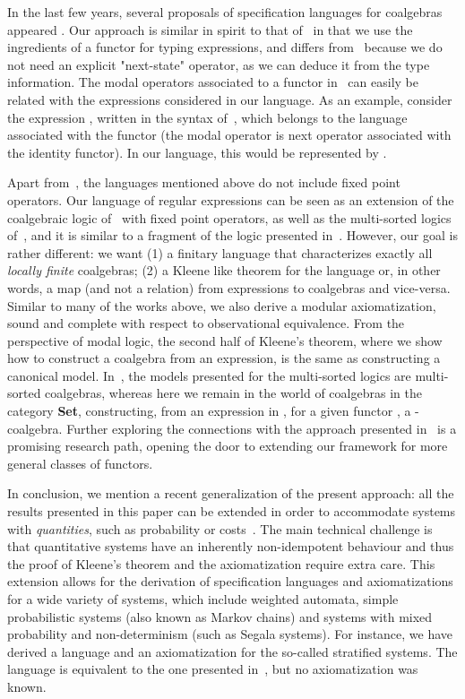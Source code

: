 \documentclass{LMCS}
\theoremstyle{definition}
\theoremstyle{plain}
\theoremstyle{plain}
\theoremstyle{plain}
\theoremstyle{plain}
\theoremstyle{definition}
\theoremstyle{definition}
\begin{document}
In the last few years, several proposals of specification languages
for coalgebras
appeared \cite{Moss99,Rossiger00,Jacobs01,Gol02,CirsteaP04,Bonsangue-Kurz05,Bonsangue-Kurz06,SP07,KV07}.
Our approach is similar in
spirit to that of~\cite{Gol02,Rossiger00,Jacobs01,SP07} in that we use the
ingredients of a functor for typing expressions, and differs
from~\cite{Rossiger00,Jacobs01} because we do not need an explicit "next-state"
operator, as we can deduce it from the type information. The modal operators associated to a functor
in~\cite{Rossiger00,Jacobs01,SP07} can easily be related with the
expressions considered in our language. As an example, consider the
expression , written in the syntax
of~\cite{Rossiger00}, which belongs to the language associated with the
functor  (the modal operator  is next
operator associated with the identity functor). In our language, this
would be represented by .

Apart from~\cite{KV07}, the languages mentioned above do not include fixed point
operators. Our language of regular expressions can be seen as an
extension of the coalgebraic logic
of~\cite{Bonsangue-Kurz05} with fixed point operators, as well as the multi-sorted logics of~\cite{SP07}, and it is similar to a fragment of the
logic presented in~\cite{KV07}. However, our goal is rather
different: we want (1) a finitary language that characterizes
exactly all \emph{locally finite} coalgebras; (2) a Kleene like
theorem for the language or, in other words, a map (and not a
relation) from expressions to coalgebras and vice-versa. Similar to
many of the works above, we also derive a modular
axiomatization, sound and complete with respect to observational
equivalence. From the perspective of modal logic, the second half of
Kleene's theorem, where we show how to construct a coalgebra from an
expression, is the same as constructing a canonical model.
In~\cite{SP07}, the models presented for the multi-sorted logics are
multi-sorted coalgebras, whereas here we remain in the world of
coalgebras in the category  \textbf{Set}, constructing, from an
expression in , for a given functor , a -coalgebra.
 Further exploring the connections with the approach presented
in~\cite{SP07} is a promising research path, opening the door to extending our framework for more general classes of functors.   

In conclusion, we mention a recent generalization of the present
approach: all the results presented in this paper can be extended in order to accommodate systems with \emph{quantities}, such as probability or costs~\cite{BBRS09}. The main
technical challenge
is that quantitative systems have an inherently non-idempotent
behaviour and thus the proof of Kleene's theorem and the
axiomatization require extra care. This extension allows for the derivation of specification languages and axiomatizations for a wide variety of systems, which include weighted automata, simple probabilistic systems (also known as Markov chains) and systems with mixed probability and non-determinism (such as Segala systems). For instance, we have derived a language and an axiomatization for the so-called stratified systems. The language is equivalent to the one presented in~\cite{GSS95}, but no axiomatization was known. 
\end{document}

